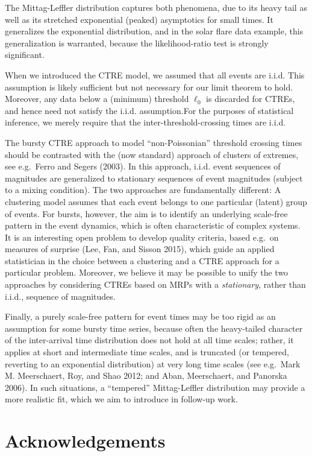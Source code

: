 \documentclass[]{elsarticle} %
\begin{document}
The Mittag-Leffler distribution captures both phenomena, due to its
heavy tail as well as its stretched exponential (peaked) asymptotics for
small times. It generalizes the exponential distribution, and in the
solar flare data example, this generalization is warranted, because the
likelihood-ratio test is strongly significant.

When we introduced the CTRE model, we assumed that all events are i.i.d.
This assumption is likely sufficient but not necessary for our limit
theorem to hold. Moreover, any data below a (minimum) threshold
\(\ell_0\) is discarded for CTREs, and hence need not satisfy the i.i.d.
assumption.For the purposes of statistical inference, we merely require
that the inter-threshold-crossing times are i.i.d.

The bursty CTRE approach to model ``non-Poissonian'' threshold crossing
times should be contrasted with the (now standard) approach of clusters
of extremes, see e.g.~Ferro and Segers (2003). In this approach, i.i.d.
event sequences of magnitudes are generalized to stationary sequences of
event magnitudes (subject to a mixing condition). The two approaches are
fundamentally different: A clustering model assumes that each event
belongs to one particular (latent) group of events. For bursts, however,
the aim is to identify an underlying scale-free pattern in the event
dynamics, which is often characteristic of complex systems. It is an
interesting open problem to develop quality criteria, based e.g.~on
measures of surprise (Lee, Fan, and Sisson 2015), which guide an applied
statistician in the choice between a clustering and a CTRE approach for
a particular problem. Moreover, we believe it may be possible to unify
the two approaches by considering CTREs based on MRPs with a
\emph{stationary}, rather than i.i.d., sequence of magnitudes.

Finally, a purely scale-free pattern for event times may be too rigid as
an assumption for some bursty time series, because often the
heavy-tailed character of the inter-arrival time distribution does not
hold at all time scales; rather, it applies at short and intermediate
time scales, and is truncated (or tempered, reverting to an exponential
distribution) at very long time scales (see e.g.~Mark M. Meerschaert,
Roy, and Shao 2012; and Aban, Meerschaert, and Panorska 2006). In such
situations, a ``tempered'' Mittag-Leffler distribution may provide a
more realistic fit, which we aim to introduce in follow-up work.

\hypertarget{acknowledgements}{%
\section*{Acknowledgements}\label{acknowledgements}}
\end{document}
